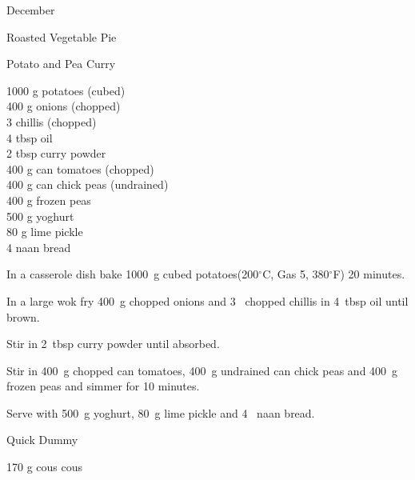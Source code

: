 \begin{menu}{December}
\begin{recipe}{2}{Roasted Vegetable Pie}
\begin{instructions}
    \end{instructions}
    \end{recipe}%
  
    \begin{recipe}{2}{Potato and Pea Curry}%
		\begin{ingredients}
		1000 g potatoes (cubed) \\
	400 g onions (chopped) \\
	3  chillis (chopped) \\
	4 tbsp oil  \\
	2 tbsp curry powder  \\
	400 g can tomatoes (chopped) \\
	400 g can chick peas (undrained) \\
	400 g frozen peas  \\
	500 g yoghurt  \\
	80 g lime pickle  \\
	4  naan bread  \\
	
		\end{ingredients}
	
	
	
    \begin{instructions}
    \item 
        In a casserole dish bake 
        1000~g cubed potatoes(200$^{\circ}$C, Gas 5, 380$^{\circ}$F) 20 minutes.
      \item 
        In a large wok fry
        400~g chopped onions
        and
        3~ chopped chillis
        in
        4~tbsp  oil
        until brown.
      \item 
        Stir in
        2~tbsp  curry powder
        until absorbed.
      \item 
        Stir in
        400~g chopped can tomatoes,
        400~g undrained can chick peas
        and
        400~g  frozen peas
        and simmer for 10 minutes.
      \item 
        Serve with
        500~g  yoghurt,
        80~g  lime pickle
        and
        4~  naan bread.
      
    \end{instructions}
    \end{recipe}%
  
    \begin{recipe}{1}{Quick Dummy}%
		\begin{ingredients}
		170 g cous cous  \\
	

\end{ingredients}
\end{recipe}
\end{menu}
